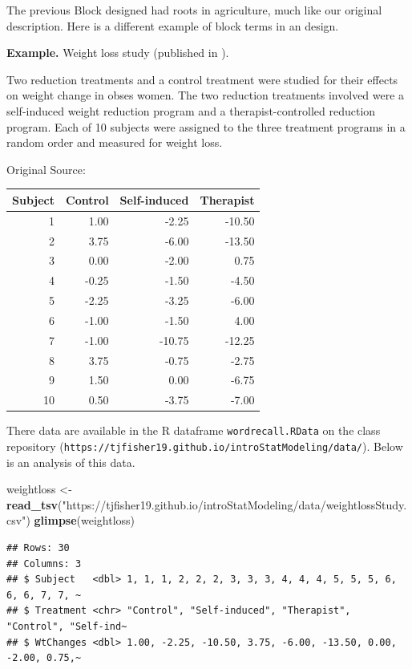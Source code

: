 \documentclass[
]{book}
\newenvironment{Shaded}{\begin{snugshade}}{\end{snugshade}}
\newcommand{\FunctionTok}[1]{\textcolor[rgb]{0.13,0.29,0.53}{\textbf{#1}}}
\newcommand{\NormalTok}[1]{#1}
\newcommand{\OtherTok}[1]{\textcolor[rgb]{0.56,0.35,0.01}{#1}}
\newcommand{\StringTok}[1]{\textcolor[rgb]{0.31,0.60,0.02}{#1}}
\begin{document}
The previous Block designed had roots in agriculture, much like our original description.
Here is a different example of block terms in an design.

\textbf{Example.} Weight loss study (published in \citet{Walpole2007}).

Two reduction treatments and a control treatment were studied for their effects on weight change in obses women.
The two reduction treatments involved were a self-induced weight reduction program and a therapist-controlled reduction program.
Each of 10 subjects were assigned to the three treatment programs in a random order and measured for weight loss.

Original Source: \citet{Hall1975}

\begin{tabular}{r|r|r|r}
\hline
Subject & Control & Self-induced & Therapist\\
\hline
1 & 1.00 & -2.25 & -10.50\\
\hline
2 & 3.75 & -6.00 & -13.50\\
\hline
3 & 0.00 & -2.00 & 0.75\\
\hline
4 & -0.25 & -1.50 & -4.50\\
\hline
5 & -2.25 & -3.25 & -6.00\\
\hline
6 & -1.00 & -1.50 & 4.00\\
\hline
7 & -1.00 & -10.75 & -12.25\\
\hline
8 & 3.75 & -0.75 & -2.75\\
\hline
9 & 1.50 & 0.00 & -6.75\\
\hline
10 & 0.50 & -3.75 & -7.00\\
\hline
\end{tabular}

There data are available in the R dataframe \texttt{wordrecall.RData} on the class repository (\texttt{https://tjfisher19.github.io/introStatModeling/data/}). Below is an analysis of this data.

\begin{Shaded}
\begin{Highlighting}[]
\NormalTok{weightloss }\OtherTok{\textless{}{-}} \FunctionTok{read\_tsv}\NormalTok{(}\StringTok{"https://tjfisher19.github.io/introStatModeling/data/weightlossStudy.csv"}\NormalTok{)}
\FunctionTok{glimpse}\NormalTok{(weightloss)}
\end{Highlighting}
\end{Shaded}

\begin{verbatim}
## Rows: 30
## Columns: 3
## $ Subject   <dbl> 1, 1, 1, 2, 2, 2, 3, 3, 3, 4, 4, 4, 5, 5, 5, 6, 6, 6, 7, 7, ~
## $ Treatment <chr> "Control", "Self-induced", "Therapist", "Control", "Self-ind~
## $ WtChanges <dbl> 1.00, -2.25, -10.50, 3.75, -6.00, -13.50, 0.00, -2.00, 0.75,~
\end{verbatim}
\end{document}
